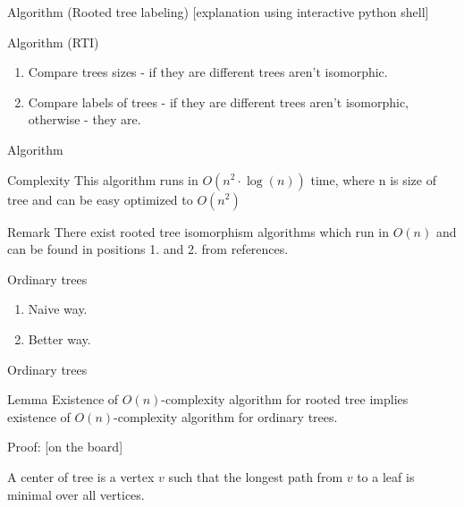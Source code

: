\documentclass{beamer}
\begin{document}
\begin{frame}{Algorithm (Rooted tree labeling)}
	[explanation using interactive python shell]
\end{frame}


\begin{frame}{Algorithm (RTI)}
	\begin{enumerate}
    \item Compare trees sizes - if they are different trees aren't isomorphic.
    \item Compare labels of trees - if they are different trees aren't isomorphic, otherwise - they are. 
    \end{enumerate}
\end{frame}

\begin{frame}{Algorithm}
\begin{block}{Complexity}
	This algorithm runs in $O(n^2 \cdot \log(n))$ time, where n is size of tree and can be easy optimized to $O(n^2)$
\end{block}

\begin{block}{Remark}
	There exist rooted tree isomorphism algorithms which run in $O(n)$ and can be found in positions 1. and 2. from references.
\end{block}

\end{frame}

\begin{frame}{Ordinary trees}
  \begin{enumerate}
    \item Naive way. 
    \item Better way.
  \end{enumerate}
\end{frame}


\begin{frame}{Ordinary trees}

\begin{block}{Lemma}
Existence of $O(n)$-complexity algorithm for rooted tree implies existence of $O(n)$-complexity algorithm for ordinary trees.
\end{block}

Proof:  [on the board]
\begin{definition}
A \alert{center of tree} is a vertex $v$ such that the longest path from $v$ to a leaf is minimal over all vertices.
\end{definition}

\end{frame}
\end{document}
